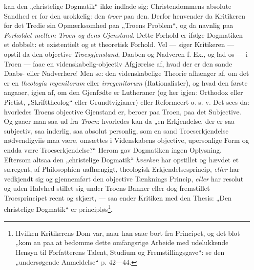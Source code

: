 \documentclass[12pt,a4paper]{book}
\begin{document}
kan den „christelige Dogmatik“ ikke indlade sig: Christendommens absolute Sandhed er for den urokkelig: den \emph{troer} paa den. Derfor henvender da Kritikeren for det Tredie sin Opmærksomhed paa „Troens Problem“, og da navnlig paa \emph{Forholdet mellem Troen og dens Gjenstand}. Dette Forhold er ifølge Dogmatiken et dobbelt: et existentielt og et theoretisk Forhold. Vel --- siger Kritikeren --- opstil da den objective \emph{Troesgjenstand}, Daaben og Nadveren f. Ex., og lad os --- i Troen --- faae en videnskabelig-objectiv Afgjørelse af, hvad der er den sande Daabs- eller Nadverlære! Men se: den videnskabelige Theorie afhænger af, om det er en \textit{theologia regenitorum} eller \textit{irregenitorum} (Rationalister), og hvad den første angaaer, igjen af, om den Gjenfødte er Lutheraner (og her igjen: Orthodox eller Pietist, „Skrifttheolog“ eller Grundtvigianer) eller Reformeert o. s. v. Det sees da: hvorledes Troens objective Gjenstand er, beroer paa Troen, paa det Subjective. Og gaaer man saa ud fra \emph{Troen}: hvorledes kan da „en Erkjendelse, der er saa subjectiv, saa inderlig, saa absolut personlig, som en sand Troeserkjendelse nødvendigviis maa være, omsættes i Videnskabens objective, upersonlige Form og endda være Troeserkjendelse?“ Herom gav Dogmatiken ingen Oplysning. Eftersom altsaa den „christelige Dogmatik“ \emph{hverken} har opstillet og hævdet et særegent, af Philosophien uafhængigt, theologisk Erkjendelsesprincip, \emph{eller} har vedkjendt sig og gjennemført den objective Tænknings Princip, \emph{eller} har resolut og uden Halvhed stillet sig under Troens Banner eller dog fremstillet Troesprincipet reent og skjært, --- saa ender Kritiken med den Thesis: „Den christelige Dogmatik“ er principløs\footnote{Hvilken Kritikerens Dom var, naar han saae bort fra Principet, og det blot „kom an paa at bedømme dette omfangsrige Arbeide med udelukkende Hensyn til Forfatterens Talent, Studium og Fremstillingsgave“: se den „undersøgende Anmeldelse“ p. 42---44.}.
\end{document}
